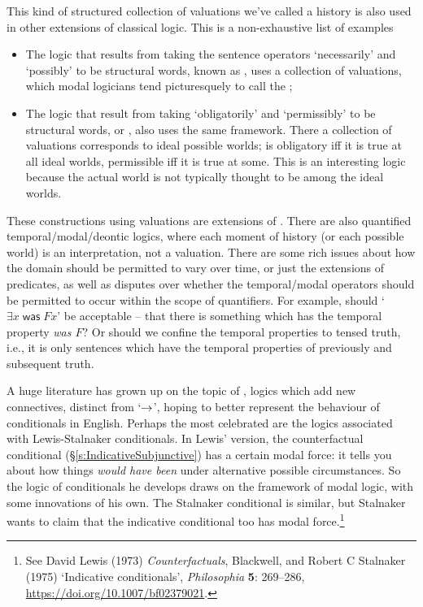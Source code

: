 This kind of structured collection of valuations we've called a history is also used in other extensions of classical logic. This is a non-exhaustive list of examples \begin{itemize}
	\item The logic that results from taking the sentence operators `necessarily' and `possibly' to be structural words, known as , uses a collection of valuations, which modal logicians tend picturesquely to call the ;
	\item The logic that result from taking `obligatorily' and `permissibly' to be structural words, or , also uses the same framework. There a collection of valuations corresponds to ideal possible worlds;  is obligatory iff it is true at all ideal worlds, permissible iff it is true at some. This is an interesting logic because the actual world is not typically thought to be among the ideal worlds. 
\end{itemize} 
These constructions using valuations are extensions of \TFL. There are also quantified temporal/modal/deontic logics, where each moment of history (or each possible world) is an interpretation, not a valuation. There are some rich issues about how the domain should be permitted to vary over time, or just the extensions of predicates, as well as disputes over whether the temporal/modal operators should be permitted to occur within the scope of quantifiers. For example, should `$\exists x \mathop{\mathsf{was}}Fx$' be acceptable – that there is something which has the temporal property \emph{was $F$}? Or should we confine the temporal properties to tensed truth, i.e., it is only sentences which have the temporal properties of previously and subsequent truth.

A huge literature has grown up on the topic of , logics which add new connectives, distinct from `$\rightarrow$', hoping to better represent the behaviour of conditionals in English. Perhaps the most celebrated are the logics associated with Lewis-Stalnaker conditionals. In Lewis' version, the counterfactual conditional (§\ref{s:IndicativeSubjunctive}) has a certain modal force: it tells you about how things \emph{would have been} under alternative possible circumstances. So the logic of conditionals he develops draws on the framework of modal logic, with some innovations of his own. The Stalnaker conditional is similar, but Stalnaker wants to claim that the indicative conditional too has modal force.\footnote{See David Lewis (1973) \emph{Counterfactuals}, Blackwell, and Robert C Stalnaker (1975) ‘Indicative conditionals’, \emph{Philosophia} \textbf{5}: 269–286, \url{https://doi.org/10.1007/bf02379021}.}

